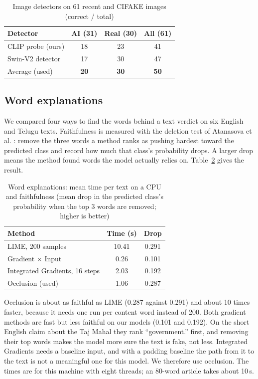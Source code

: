 \documentclass[conference]{IEEEtran}
\begin{document}
\begin{table}[t]
\caption{Image detectors on 61 recent and CIFAKE images (correct / total)}
\label{tab:imgens}
\centering
\footnotesize
\setlength{\tabcolsep}{4pt}
\begin{tabular}{@{}lccc@{}}
\toprule
Detector & AI (31) & Real (30) & All (61) \\
\midrule
CLIP probe (ours) & 18 & 23 & 41 \\
Swin-V2 detector \cite{haywoodsloan2024detector} & 17 & 30 & 47 \\
Average (used) & \textbf{20} & \textbf{30} & \textbf{50} \\
\bottomrule
\end{tabular}
\end{table}

\subsection{Word explanations}
\label{sec:explres}
We compared four ways to find the words behind a text verdict on six English and Telugu texts. Faithfulness is measured with the deletion test of Atanasova et al. \cite{atanasova2020diagnostic}: remove the three words a method ranks as pushing hardest toward the predicted class and record how much that class's probability drops. A larger drop means the method found words the model actually relies on. Table~\ref{tab:expl} gives the result.

\begin{table}[t]
\caption{Word explanations: mean time per text on a CPU and faithfulness (mean drop in the predicted class's probability when the top 3 words are removed; higher is better)}
\label{tab:expl}
\centering
\footnotesize
\setlength{\tabcolsep}{4pt}
\begin{tabular}{@{}lcc@{}}
\toprule
Method & Time (s) & Drop \\
\midrule
LIME, 200 samples \cite{ribeiro2016lime} & 10.41 & 0.291 \\
Gradient $\times$ Input & 0.26 & 0.101 \\
Integrated Gradients, 16 steps \cite{sundararajan2017ig} & 2.03 & 0.192 \\
Occlusion (used) & 1.06 & 0.287 \\
\bottomrule
\end{tabular}
\end{table}

Occlusion is about as faithful as LIME (0.287 against 0.291) and about 10 times faster, because it needs one run per content word instead of 200. Both gradient methods are fast but less faithful on our models (0.101 and 0.192). On the short English claim about the Taj Mahal they rank ``government.'' first, and removing their top words makes the model more sure the text is fake, not less. Integrated Gradients needs a baseline input, and with a padding baseline the path from it to the text is not a meaningful one for this model. We therefore use occlusion. The times are for this machine with eight threads; an 80-word article takes about 10\,s.
\end{document}
